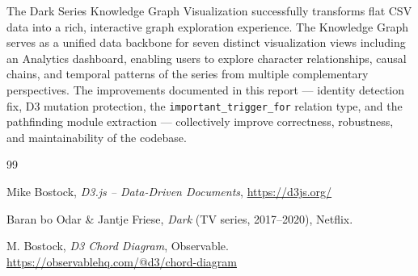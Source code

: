 \documentclass[11pt,a4paper]{article}
\begin{document}
The Dark Series Knowledge Graph Visualization successfully transforms flat CSV data into a rich, interactive graph exploration experience. The Knowledge Graph serves as a unified data backbone for seven distinct visualization views including an Analytics dashboard, enabling users to explore character relationships, causal chains, and temporal patterns of the series from multiple complementary perspectives. The improvements documented in this report --- identity detection fix, D3 mutation protection, the \texttt{important\_trigger\_for} relation type, and the pathfinding module extraction --- collectively improve correctness, robustness, and maintainability of the codebase.

\begin{thebibliography}{99}
\raggedright

Mike Bostock,
\textit{D3.js -- Data-Driven Documents},
\url{https://d3js.org/}

Baran bo Odar \& Jantje Friese,
\textit{Dark} (TV series, 2017--2020),
Netflix.

M. Bostock,
\textit{D3 Chord Diagram},
Observable. \url{https://observablehq.com/@d3/chord-diagram}

\end{thebibliography}
\end{document}
